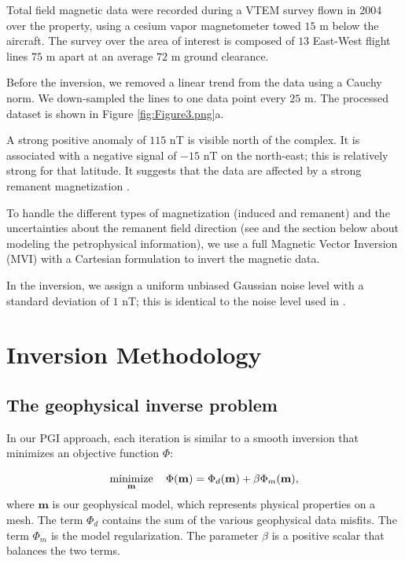 \documentclass[paper, twocolumn]{geophysics} %
\begin{document}
Total field magnetic data were recorded during a VTEM survey flown in 2004 over the property, using a cesium vapor magnetometer towed $15$ m below the aircraft. The survey over the area of interest is composed of $13$ East-West flight lines $75$ m apart at an average $72$ m ground clearance.

Before the inversion, we removed a linear trend from the data using a Cauchy norm. We down-sampled the lines to one data point every $25$ m. The processed dataset is shown in Figure \ref{fig:Figure3.png}a.

A strong positive anomaly of $115$ nT is visible north of the complex. It is associated with a negative signal of $-15$ nT on the north-east; this is relatively strong for that latitude. It suggests that the data are affected by a strong remanent magnetization \citep{TKCpaper}.

To handle the different types of magnetization (induced and remanent) and the uncertainties about the remanent field direction (see \citet{TKCpaper} and the section below about modeling the petrophysical information), we use a full Magnetic Vector Inversion (MVI) with a Cartesian formulation \citep{MVI} to invert the magnetic data.

In the inversion, we assign a uniform unbiased Gaussian noise level with a standard deviation of $1$ nT; this is identical to the noise level used in \citet{TKCpaper}.


\section{Inversion Methodology}

\subsection{The geophysical inverse problem}

In our PGI approach, each iteration is similar to a smooth inversion \citep{Tutorial} that minimizes an objective function $\Phi$:

\begin{equation}
\mathop{\hbox{minimize}}\limits_{\mathbf{m}}\quad\Phi(\mathbf{m}) = \Phi_d(\mathbf{m}) + \beta \Phi_m(\mathbf{m}), \label{tikhonov}
\end{equation}
where $\mathbf{m}$ is our geophysical model, which represents physical properties on a mesh. The term $\Phi_d$ contains the sum of the various geophysical data misfits. The term $\Phi_m$ is the model regularization. The parameter $\beta$ is a positive scalar that balances the two terms.
\end{document}
